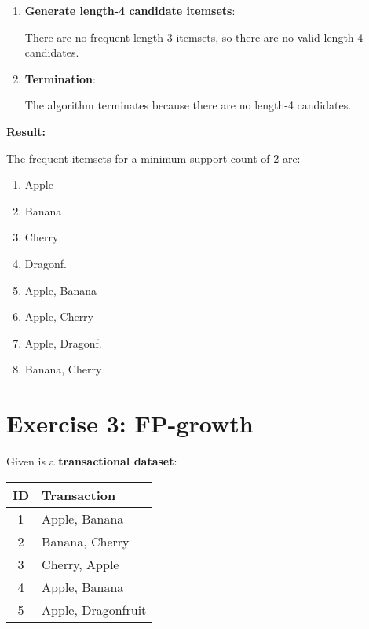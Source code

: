 \documentclass[
english,
smallborders
]{i6prcsht}
\begin{document}
\begin{solution}
\begin{enumerate}
		\item \textbf{Generate length-4 candidate itemsets}:

		      There are no frequent length-3 itemsets, so there are no valid length-4 candidates.

		\item \textbf{Termination}:

		      The algorithm terminates because there are no length-4 candidates.

	\end{enumerate}

	\textbf{Result:}

	\vspace*{-0.2cm}

	The frequent itemsets for a minimum support count of 2 are:

	\begin{multicols}{4}
		\begin{enumerate}
			\item Apple
			\item Banana
			\item Cherry
			\item Dragonf.
			\item Apple, Banana
			\item Apple, Cherry
			\item Apple, Dragonf.
			\item Banana, Cherry
		\end{enumerate}
	\end{multicols}
\end{solution}

\section*{Exercise 3: FP-growth}

Given is a \textbf{transactional dataset}:

\begin{center}
	\begin{tabular}{|c|l|}
		\hline
		\textbf{ID} & \textbf{Transaction} \\
		\hline
		1           & Apple, Banana        \\
		\hline
		2           & Banana, Cherry       \\
		\hline
		3           & Cherry, Apple        \\
		\hline
		4           & Apple, Banana        \\
		\hline
		5           & Apple, Dragonfruit   \\
		\hline
	\end{tabular}
\end{center}
\end{document}
